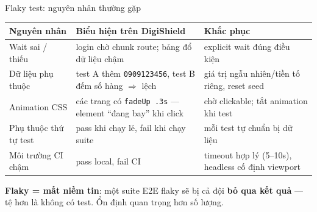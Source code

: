 \documentclass[aspectratio=169,12pt]{beamer}
\begin{document}
\begin{frame}{Flaky test: nguyên nhân thường gặp}
  \vspace*{-0.5em}
  \begin{center}
  \footnotesize
  \begin{tabular}{p{3.6cm}p{4.6cm}p{3.4cm}}
    \toprule
    \textbf{Nguyên nhân} & \textbf{Biểu hiện trên DigiShield}
      & \textbf{Khắc phục} \\
    \midrule
    Wait sai / thiếu & login chờ chunk route; bảng đổ dữ liệu chậm
      & explicit wait đúng điều kiện \\
    Dữ liệu phụ thuộc & test A thêm \texttt{0909123456},
      test B đếm số hàng $\Rightarrow$ lệch
      & giá trị ngẫu nhiên/tiền tố riêng, reset seed \\
    Animation CSS & các trang có \texttt{fadeUp .3s}
      --- element ``đang bay'' khi click
      & chờ clickable; tắt animation khi test \\
    Phụ thuộc thứ tự test & pass khi chạy lẻ, fail khi chạy suite
      & mỗi test tự chuẩn bị dữ liệu \\
    Môi trường CI chậm & pass local, fail CI
      & timeout hợp lý (5--10s), headless cố định viewport \\
    \bottomrule
  \end{tabular}
  \end{center}

  {\small \textbf{Flaky = mất niềm tin}: một suite E2E flaky sẽ bị cả đội
  \textbf{bỏ qua kết quả} --- tệ hơn là không có test. Ổn định quan trọng
  hơn số lượng.}
\end{frame}
\end{document}
